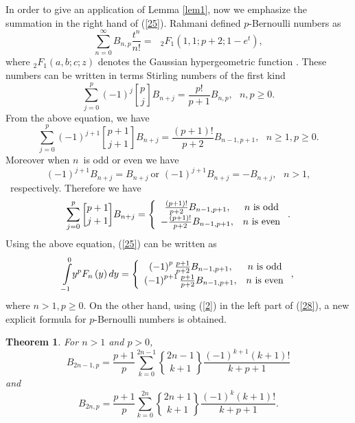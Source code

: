 \documentclass{article}%
\newtheorem{theorem}{Theorem}
\begin{document}
In order to give an application of Lemma \ref{lem1}, now we emphasize the
summation in the right hand of (\ref{25}). Rahmani \cite{Rahmani} defined
$p$-Bernoulli numbers as
\[
\sum_{n=0}^{\infty}B_{n,p}\frac{t^{n}}{n!}=\text{ }_{2}F_{1}\left(
1,1;p+2;1-e^{t}\right)  ,
\]
where $_{2}F_{1}\left(  a,b;c;z\right)  $ denotes the Gaussian hypergeometric
function \cite{Andrews}. These numbers can be written in terms Stirling
numbers of the first kind
\[
\sum_{j=0}^{p}\left(  -1\right)  ^{j}%
\genfrac{[}{]}{0pt}{}{p}{j}%
B_{n+j}=\frac{p!}{p+1}B_{n,p},\text{ \ }n,p\geq0.
\]
From the above equation, we have
\begin{equation}
\sum_{j=0}^{p}\left(  -1\right)  ^{j+1}%
\genfrac{[}{]}{0pt}{}{p+1}{j+1}%
B_{n+j}=\frac{\left(  p+1\right)  !}{p+2}B_{n-1,p+1},\text{ \ }n\geq1,p\geq0.
\label{27}%
\end{equation}
Moreover when $n$\ is odd or even we have
\[
\left(  -1\right)  ^{j+1}B_{n+j}=B_{n+j}\ \text{or }\left(  -1\right)
^{j+1}B_{n+j}=-B_{n+j},\text{ \ }n>1,
\]
\ respectively. Therefore we have%
\[
\sum_{j=0}^{p}%
\genfrac{[}{]}{0pt}{}{p+1}{j+1}%
B_{n+j}=\left\{
\begin{array}
[c]{cc}%
\frac{\left(  p+1\right)  !}{p+2}B_{n-1,p+1}, & n\text{ is odd}\\
-\frac{\left(  p+1\right)  !}{p+2}B_{n-1,p+1}, & n\text{ is even}%
\end{array}
\right.  .
\]
Using the above equation, (\ref{25}) can be written as
\begin{equation}%
{\displaystyle\int\limits_{-1}^{0}}
y^{p}F_{n}\left(  y\right)  dy=\left\{
\begin{array}
[c]{cc}%
\left(  -1\right)  ^{p}\frac{p+1}{p+2}B_{n-1,p+1}, & n\text{ is odd}\\
\left(  -1\right)  ^{p+1}\frac{p+1}{p+2}B_{n-1,p+1}, & n\text{ is even}%
\end{array}
\right.  , \label{28}%
\end{equation}
where $n>1,p\geq0.$ On the other hand, using (\ref{2}) in the left part of
(\ref{28}), a new explicit formula for $p$-Bernoulli numbers is obtained.

\begin{theorem}
For $n>1$ and $p>0$,%
\[
B_{2n-1,p}=\frac{p+1}{p}\sum_{k=0}^{2n-1}%
\genfrac{\{}{\}}{0pt}{}{2n-1}{k+1}%
\frac{\left(  -1\right)  ^{k+1}\left(  k+1\right)  !}{k+p+1}%
\]
and%
\[
B_{2n,p}=\frac{p+1}{p}\sum_{k=0}^{2n}%
\genfrac{\{}{\}}{0pt}{}{2n+1}{k+1}%
\frac{\left(  -1\right)  ^{k}\left(  k+1\right)  !}{k+p+1}.
\]

\end{theorem}
\end{document}
